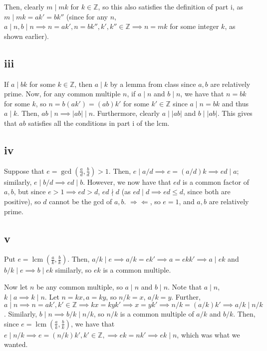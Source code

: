 \documentclass[12pt,letterpaper]{article}
\theoremstyle{definition}
\newcommand{\contra}{\Rightarrow\!\Leftarrow}
\newcommand{\Z}{\mathbb{Z}}
\DeclareMathOperator{\lcm}{lcm}
\begin{document}
Then, clearly $m \mid mk$ for $k \in \Z$, so this also satisfies the definition of part i, as $m \mid mk = ak' = bk''$ (since for any $n$, $a \mid n, b \mid n \implies n = ak', n = bk'', k',k'' \in \Z \implies n = mk$ for some integer $k$, as shown earlier).

\subsection*{iii}

If $a \mid bk$ for some $k \in \Z$, then $a \mid k$ by a lemma from class since $a,b$ are relatively prime. Now, for any common multiple $n$, if $a \mid n$ and $b \mid n$, we have that $n = bk$ for some $k$, so $n = b(ak') = (ab)k'$ for some $k' \in \Z$ since $a \mid n = bk$ and thus $a \mid k$. Then, $ab \mid n \implies |ab| \mid n$. Furthermore, clearly $a \mid |ab|$ and $b \mid |ab|$. This gives that $ab$ satisfies all the conditions in part i of the lcm.

\subsection*{iv}

Suppose that $e = \gcd\left(\frac{a}{d},\frac{b}{d}\right) > 1$. Then, $e \mid a/d \implies e = (a/d)k \implies ed \mid a$; similarly, $e \mid b/d \implies ed \mid b$. However, we now have that $ed$ is a common factor of $a, b$, but since $e > 1 \implies ed > d$, $ed \nmid d$ (as $ed \mid d \implies ed \leq d$, since both are positive), so $d$ cannot be the gcd of $a, b$. $\contra$, so $e = 1$, and $a,b$ are relatively prime.

\subsection*{v}

Put $e = \lcm\left(\frac{a}{k}, \frac{b}{k}\right)$. Then, $a/k \mid e \implies a/k = ek' \implies a = ekk' \implies a \mid ek$ and $b/k \mid e \implies b \mid ek$ similarly, so $ek$ is a common multiple.

Now let $n$ be any common multiple, so $a \mid n$ and $b \mid n$. Note that $a \mid n$, $k \mid a \implies k \mid n$. Let $n = kx, a = ky$, so $n/k = x$, $a/k = y$. Further, $a \mid n \implies n = ak', k' \in \Z \implies kx = kyk' \implies x =  yk' \implies n/k = (a/k)k' \implies a/k \mid n/k$. Similarly, $b \mid n \implies b/k \mid n/k$, so $n/k$ is a common multiple of $a/k$ and $b/k$. Then, since $e = \lcm\left(\frac{a}{k},\frac{b}{k}\right)$, we have that $e \mid n/k \implies e = (n/k)k', k' \in \Z, \implies ek = nk' \implies ek \mid n$, which was what we wanted.
\end{document}
